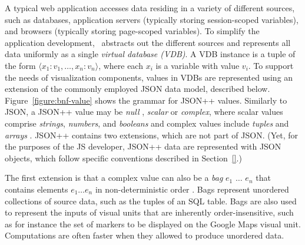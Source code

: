  A typical web application accesses data residing in a variety of different sources, such as databases, application servers (typically storing session-scoped variables), and browsers (typically storing page-scoped variables). To simplify the application development, \projname\ abstracts out the different sources and represents all data uniformly as a single \emph{virtual database (VDB)}. A VDB instance is a tuple of the form $\langle x_1 : v_1, \ldots, x_n : v_n \rangle$, where each $x_i$ is a variable with value $v_i$. To support the needs of visualization components, values in VDBs are represented using an extension of the commonly employed JSON data model, described below.\\


 Figure~\ref{figure:bnf-value} shows the grammar for JSON++ values. Similarly to JSON, a JSON++ value may be \textit{null} , \textit{scalar} or \textit{complex}, where scalar values comprise \textit{strings}, \textit{numbers}, and \textit{booleans}  and complex values include \textit{tuples}  and \textit{arrays} . JSON++ contains two extensions, which are not part of JSON. (Yet, for the purposes of the JS developer, JSON++ data are represented with JSON objects, which follow specific conventions described in Section~\ref{}.) 


The first extension is that a complex value can also be a \textit{bag} \gl{\{\{} $e_1$\gl{,} $\ldots$\gl{,} $e_n$ \gl{\}\}} that contains elements $e_1 \ldots e_n$ in non-deterministic order . Bags represent unordered collections of source data, such as the tuples of an SQL table. Bags are also used to represent the inputs of visual units that are inherently order-insensitive, such as for instance the set of markers to be displayed on the Google Maps visual unit. Computations are often faster when they allowed to produce unordered data.  


